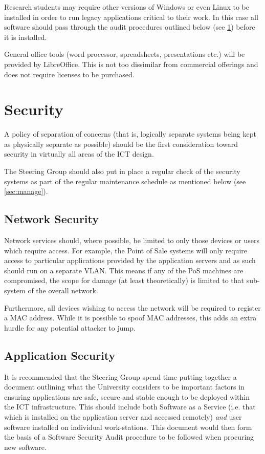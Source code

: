 \documentclass[a4paper, twoside]{article}
\begin{document}
Research students may require other versions of Windows or even Linux to be
installed in order to run legacy applications critical to their work. In this
case all software should pass through the audit procedures outlined below (see
\ref{sec:security}) before it is installed.

General office tools (word processor, spreadsheets, presentations etc.) will be
provided by LibreOffice. This is not too dissimilar from commercial offerings
and does not require licenses to be purchased.

\section{Security}
\label{sec:security}
A policy of separation of concerns (that is, logically separate systems being
kept as physically separate as possible) should be the first consideration
toward security in virtually all areas of the ICT design.

The Steering Group should also put in place a regular check of the security
systems as part of the regular maintenance schedule as mentioned below
(see \ref{sec:manage}).

\subsection{Network Security}
Network services should, where possible, be limited to only those devices or
users which require access. For example, the Point of Sale systems will only
require access to particular applications provided by the application servers
and as such should run on a separate VLAN. This means if any of the PoS
machines are compromised, the scope for damage (at least theoretically) is
limited to that sub-system of the overall network.

Furthermore, all devices wishing to access the network will be required to
register a MAC address. While it is possible to spoof MAC addresses, this adds
an extra hurdle for any potential attacker to jump.

\subsection{Application Security}
It is recommended that the Steering Group spend time putting together a document
outlining what the University considers to be important factors in ensuring
applications are safe, secure and stable enough to be deployed within the ICT
infrastructure. This should include both Software as a Service (i.e. that which
is installed on the application server and accessed remotely) \emph{and} user
software installed on individual work-stations. This document would then form
the basis of a Software Security Audit procedure to be followed when procuring new
software.
\end{document}
